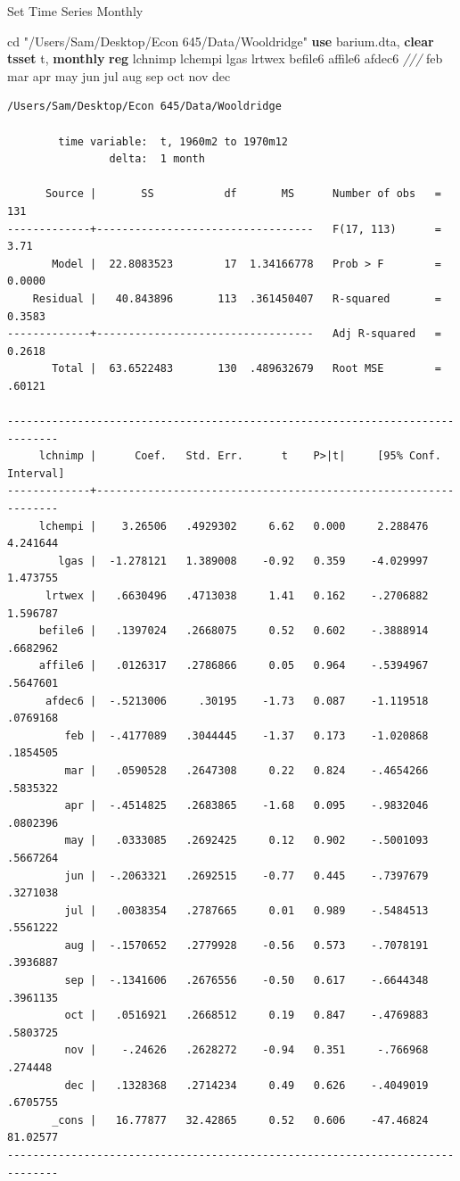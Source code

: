 \documentclass[
]{book}
\newenvironment{Shaded}{\begin{snugshade}}{\end{snugshade}}
\newcommand{\CommentTok}[1]{\textcolor[rgb]{0.56,0.35,0.01}{\textit{#1}}}
\newcommand{\FunctionTok}[1]{\textcolor[rgb]{0.13,0.29,0.53}{\textbf{#1}}}
\newcommand{\KeywordTok}[1]{\textcolor[rgb]{0.13,0.29,0.53}{\textbf{#1}}}
\newcommand{\NormalTok}[1]{#1}
\newcommand{\StringTok}[1]{\textcolor[rgb]{0.31,0.60,0.02}{#1}}
\begin{document}
Set Time Series Monthly

\begin{Shaded}
\begin{Highlighting}[]
\NormalTok{cd }\StringTok{"/Users/Sam/Desktop/Econ 645/Data/Wooldridge"}
\KeywordTok{use}\NormalTok{ barium.dta, }\KeywordTok{clear}
\KeywordTok{tsset}\NormalTok{ t, }\FunctionTok{monthly}
\KeywordTok{reg}\NormalTok{ lchnimp lchempi lgas lrtwex befile6 affile6 afdec6 }\CommentTok{///}
\NormalTok{  feb mar apr may jun jul aug sep oct nov dec}
\end{Highlighting}
\end{Shaded}

\begin{verbatim}
/Users/Sam/Desktop/Econ 645/Data/Wooldridge

        time variable:  t, 1960m2 to 1970m12
                delta:  1 month

      Source |       SS           df       MS      Number of obs   =       131
-------------+----------------------------------   F(17, 113)      =      3.71
       Model |  22.8083523        17  1.34166778   Prob > F        =    0.0000
    Residual |   40.843896       113  .361450407   R-squared       =    0.3583
-------------+----------------------------------   Adj R-squared   =    0.2618
       Total |  63.6522483       130  .489632679   Root MSE        =    .60121

------------------------------------------------------------------------------
     lchnimp |      Coef.   Std. Err.      t    P>|t|     [95% Conf. Interval]
-------------+----------------------------------------------------------------
     lchempi |    3.26506   .4929302     6.62   0.000     2.288476    4.241644
        lgas |  -1.278121   1.389008    -0.92   0.359    -4.029997    1.473755
      lrtwex |   .6630496   .4713038     1.41   0.162    -.2706882    1.596787
     befile6 |   .1397024   .2668075     0.52   0.602    -.3888914    .6682962
     affile6 |   .0126317   .2786866     0.05   0.964    -.5394967    .5647601
      afdec6 |  -.5213006     .30195    -1.73   0.087    -1.119518    .0769168
         feb |  -.4177089   .3044445    -1.37   0.173    -1.020868    .1854505
         mar |   .0590528   .2647308     0.22   0.824    -.4654266    .5835322
         apr |  -.4514825   .2683865    -1.68   0.095    -.9832046    .0802396
         may |   .0333085   .2692425     0.12   0.902    -.5001093    .5667264
         jun |  -.2063321   .2692515    -0.77   0.445    -.7397679    .3271038
         jul |   .0038354   .2787665     0.01   0.989    -.5484513    .5561222
         aug |  -.1570652   .2779928    -0.56   0.573    -.7078191    .3936887
         sep |  -.1341606   .2676556    -0.50   0.617    -.6644348    .3961135
         oct |   .0516921   .2668512     0.19   0.847    -.4769883    .5803725
         nov |    -.24626   .2628272    -0.94   0.351     -.766968     .274448
         dec |   .1328368   .2714234     0.49   0.626    -.4049019    .6705755
       _cons |   16.77877   32.42865     0.52   0.606    -47.46824    81.02577
------------------------------------------------------------------------------
\end{verbatim}
\end{document}
